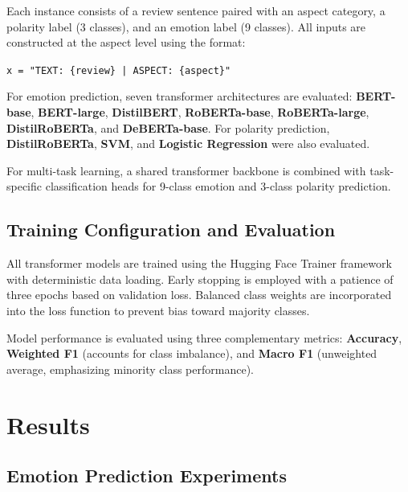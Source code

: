 \documentclass[10pt]{article}
\begin{document}
Each instance consists of a review sentence paired with an aspect category, a polarity label (3 classes), and an emotion label (9 classes). All inputs are constructed at the aspect level using the format:

\begin{tcolorbox}[colback=lightgray, colframe=medgray, arc=3pt]
\texttt{x = "TEXT: \{review\} | ASPECT: \{aspect\}"}
\end{tcolorbox}

For emotion prediction, seven transformer architectures are evaluated:
\textbf{BERT-base}, \textbf{BERT-large}, \textbf{DistilBERT}, \textbf{RoBERTa-base}, \textbf{RoBERTa-large}, \textbf{DistilRoBERTa}, and \textbf{DeBERTa-base}. For polarity prediction, \textbf{DistilRoBERTa}, \textbf{SVM}, and \textbf{Logistic Regression} were also evaluated.

For multi-task learning, a shared transformer backbone is combined with task-specific classification heads for 9-class emotion and 3-class polarity prediction.

\subsection{Training Configuration and Evaluation}

All transformer models are trained using the Hugging Face Trainer framework with deterministic data loading. Early stopping is employed with a patience of three epochs based on validation loss. Balanced class weights are incorporated into the loss function to prevent bias toward majority classes.

Model performance is evaluated using three complementary metrics: \textbf{Accuracy}, \textbf{Weighted F1} (accounts for class imbalance), and \textbf{Macro F1} (unweighted average, emphasizing minority class performance).

\section{Results}

\subsection{Emotion Prediction Experiments}
\end{document}
